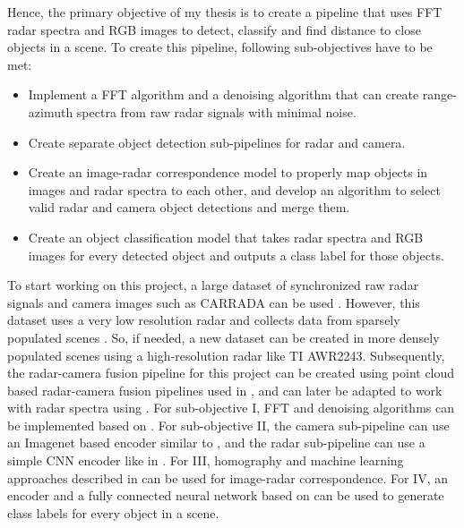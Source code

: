 \documentclass[11pt]{article}
\begin{document}
Hence, the primary objective of my thesis is to create a pipeline that uses FFT radar
spectra and RGB images to detect, classify and find distance to close objects in a scene. To
create this pipeline, following sub-objectives have to be met:
\begin{itemize}
    \item Implement a FFT algorithm and a denoising algorithm that can create range-azimuth spectra from raw radar signals with minimal noise.
    \item Create separate object detection sub-pipelines for radar and camera.
    \item Create an image-radar correspondence model to properly map objects in images and radar spectra to each other, and develop an algorithm to select valid radar and camera object detections and merge them.
    \item Create an object classification model that takes radar spectra and RGB images for every detected object and outputs a class label for those objects.
\end{itemize}
To start working on this project, a large dataset of synchronized raw radar signals and
camera images such as CARRADA can be used \cite{7}. However, this dataset uses a very low
resolution radar and collects data from sparsely populated scenes \cite{7}. So, if needed, a new
dataset can be created in more densely populated scenes using a high-resolution radar like TI
AWR2243. Subsequently, the radar-camera fusion pipeline for this project can be created using
point cloud based radar-camera fusion pipelines used in \cite{2}\cite{4}, and can later be adapted to work
with radar spectra using \cite{5}\cite{10}. For sub-objective I, FFT and denoising algorithms can be
implemented based on \cite{5}\cite{8}\cite{9}. For sub-objective II, the camera sub-pipeline can use an
Imagenet based encoder similar to \cite{1}\cite{2}, and the radar sub-pipeline can use a simple CNN
encoder like in \cite{5}. For III, homography and machine learning approaches described in \cite{2} can
be used for image-radar correspondence. For IV, an encoder and a fully connected neural
network based on \cite{2}\cite{4}\cite{5} can be used to generate class labels for every object in a scene.
\end{document}
